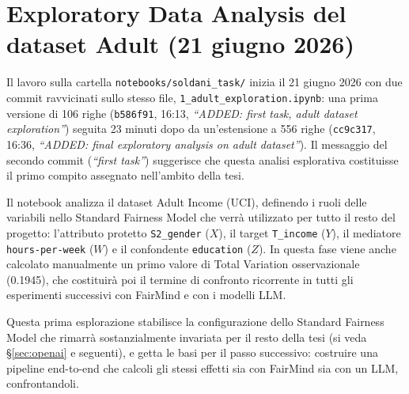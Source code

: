 \section{Exploratory Data Analysis del dataset Adult (21 giugno 2026)}
\label{sec:eda}

Il lavoro sulla cartella \texttt{notebooks/soldani\_task/} inizia il 21 giugno 2026 con due commit ravvicinati sullo stesso file, \texttt{1\_adult\_exploration.ipynb}: una prima versione di 106 righe (\texttt{b586f91}, 16:13, \emph{``ADDED: first task, adult dataset exploration''}) seguita 23 minuti dopo da un'estensione a 556 righe (\texttt{cc9c317}, 16:36, \emph{``ADDED: final exploratory analysis on adult dataset''}). Il messaggio del secondo commit (\emph{``first task''}) suggerisce che questa analisi esplorativa costituisse il primo compito assegnato nell'ambito della tesi.

Il notebook analizza il dataset Adult Income (UCI), definendo i ruoli delle variabili nello Standard Fairness Model che verrà utilizzato per tutto il resto del progetto: l'attributo protetto \texttt{S2\_gender} ($X$), il target \texttt{T\_income} ($Y$), il mediatore \texttt{hours-per-week} ($W$) e il confondente \texttt{education} ($Z$). In questa fase viene anche calcolato manualmente un primo valore di Total Variation osservazionale (0.1945), che costituirà poi il termine di confronto ricorrente in tutti gli esperimenti successivi con FairMind e con i modelli LLM.

Questa prima esplorazione stabilisce la configurazione dello Standard Fairness Model che rimarrà sostanzialmente invariata per il resto della tesi (si veda \S\ref{sec:openai} e seguenti), e getta le basi per il passo successivo: costruire una pipeline end-to-end che calcoli gli stessi effetti sia con FairMind sia con un LLM, confrontandoli.
